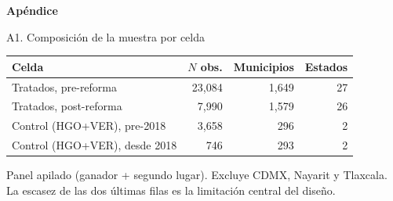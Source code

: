 \documentclass[
  aspectratio=43,        %
  t,                     %
  10pt                   %
]{beamer}
\begin{document}
\appendix

\begin{frame}
  \centering
  \vfill
  {\Large \textcolor{ITAMgreen}{\bfseries Apéndice}}
  \vfill
\end{frame}

\begin{frame}[noframenumbering]{A1. Composición de la muestra por celda}

  \begin{table}\centering\small
    \begin{tabular}{lrrr}
      \toprule
      Celda & $N$ obs. & Municipios & Estados \\
      \midrule
      Tratados, pre-reforma            & 23{,}084 & 1{,}649 & 27 \\
      Tratados, post-reforma           & 7{,}990  & 1{,}579 & 26 \\
      Control (HGO+VER), pre-2018      & 3{,}658  & 296     & 2  \\
      Control (HGO+VER), desde 2018    & 746      & 293     & 2  \\
      \bottomrule
    \end{tabular}
  \end{table}

  \vspace{0.3em}
  {\footnotesize \textcolor{ITAMgray}{%
    Panel apilado (ganador + segundo lugar). Excluye CDMX, Nayarit y Tlaxcala.
    La escasez de las dos últimas filas es la limitación central del diseño.}}

\end{frame}
\end{document}
